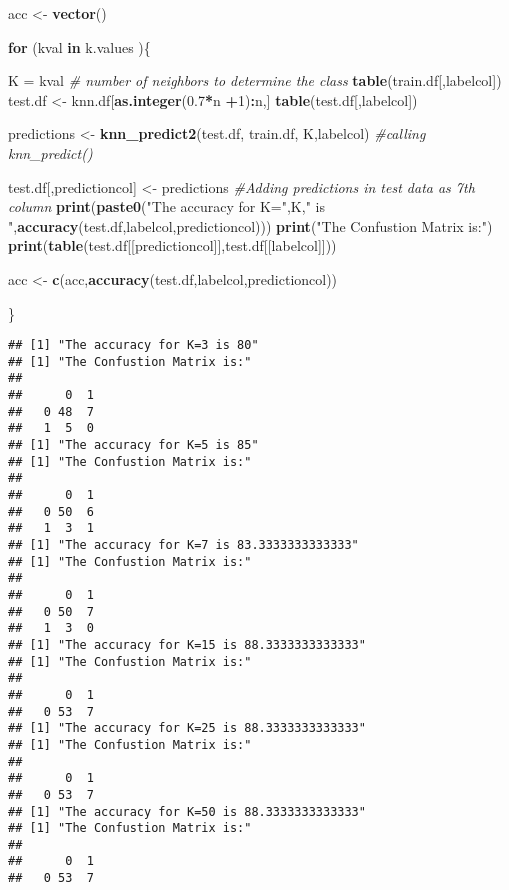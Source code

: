 \documentclass[]{article}
\newenvironment{Shaded}{\begin{snugshade}}{\end{snugshade}}
\newcommand{\KeywordTok}[1]{\textcolor[rgb]{0.13,0.29,0.53}{\textbf{#1}}}
\newcommand{\DecValTok}[1]{\textcolor[rgb]{0.00,0.00,0.81}{#1}}
\newcommand{\FloatTok}[1]{\textcolor[rgb]{0.00,0.00,0.81}{#1}}
\newcommand{\StringTok}[1]{\textcolor[rgb]{0.31,0.60,0.02}{#1}}
\newcommand{\CommentTok}[1]{\textcolor[rgb]{0.56,0.35,0.01}{\textit{#1}}}
\newcommand{\ControlFlowTok}[1]{\textcolor[rgb]{0.13,0.29,0.53}{\textbf{#1}}}
\newcommand{\OperatorTok}[1]{\textcolor[rgb]{0.81,0.36,0.00}{\textbf{#1}}}
\newcommand{\NormalTok}[1]{#1}
\begin{document}
\begin{Shaded}
\begin{Highlighting}[]
\NormalTok{acc <-}\StringTok{ }\KeywordTok{vector}\NormalTok{()}

\ControlFlowTok{for}\NormalTok{ (kval }\ControlFlowTok{in}\NormalTok{ k.values )\{}

\NormalTok{  K =}\StringTok{ }\NormalTok{kval }\CommentTok{# number of neighbors to determine the class}
  \KeywordTok{table}\NormalTok{(train.df[,labelcol])}
\NormalTok{  test.df <-}\StringTok{ }\NormalTok{knn.df[}\KeywordTok{as.integer}\NormalTok{(}\FloatTok{0.7}\OperatorTok{*}\NormalTok{n }\OperatorTok{+}\DecValTok{1}\NormalTok{)}\OperatorTok{:}\NormalTok{n,]}
  \KeywordTok{table}\NormalTok{(test.df[,labelcol])}
  
\NormalTok{  predictions <-}\StringTok{ }\KeywordTok{knn_predict2}\NormalTok{(test.df, train.df, K,labelcol) }\CommentTok{#calling knn_predict()}
  
\NormalTok{  test.df[,predictioncol] <-}\StringTok{ }\NormalTok{predictions }\CommentTok{#Adding predictions in test data as 7th column}
  \KeywordTok{print}\NormalTok{(}\KeywordTok{paste0}\NormalTok{(}\StringTok{"The accuracy for K="}\NormalTok{,K,}\StringTok{" is "}\NormalTok{,}\KeywordTok{accuracy}\NormalTok{(test.df,labelcol,predictioncol)))}
  \KeywordTok{print}\NormalTok{(}\StringTok{"The Confustion Matrix is:"}\NormalTok{)}
  \KeywordTok{print}\NormalTok{(}\KeywordTok{table}\NormalTok{(test.df[[predictioncol]],test.df[[labelcol]]))}
  
\NormalTok{  acc <-}\StringTok{ }\KeywordTok{c}\NormalTok{(acc,}\KeywordTok{accuracy}\NormalTok{(test.df,labelcol,predictioncol))}

\NormalTok{\}}
\end{Highlighting}
\end{Shaded}

\begin{verbatim}
## [1] "The accuracy for K=3 is 80"
## [1] "The Confustion Matrix is:"
##    
##      0  1
##   0 48  7
##   1  5  0
## [1] "The accuracy for K=5 is 85"
## [1] "The Confustion Matrix is:"
##    
##      0  1
##   0 50  6
##   1  3  1
## [1] "The accuracy for K=7 is 83.3333333333333"
## [1] "The Confustion Matrix is:"
##    
##      0  1
##   0 50  7
##   1  3  0
## [1] "The accuracy for K=15 is 88.3333333333333"
## [1] "The Confustion Matrix is:"
##    
##      0  1
##   0 53  7
## [1] "The accuracy for K=25 is 88.3333333333333"
## [1] "The Confustion Matrix is:"
##    
##      0  1
##   0 53  7
## [1] "The accuracy for K=50 is 88.3333333333333"
## [1] "The Confustion Matrix is:"
##    
##      0  1
##   0 53  7
\end{verbatim}
\end{document}
